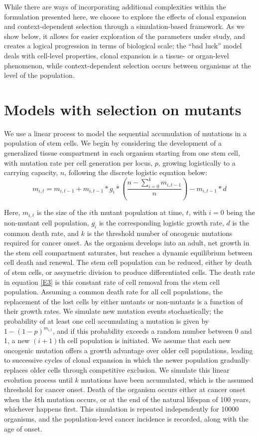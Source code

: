 \documentclass[9pt,twocolumn,twoside]{pnas-new}
\begin{document}
While there are ways of incorporating additional complexities within the formulation presented here, we choose to explore the effects of clonal expansion and context-dependent selection through a simulation-based framework. As we show below, it allows for easier exploration of the parameters under study, and creates a logical progression in terms of biological scale; the ``bad luck'' model deals with cell-level properties, clonal expansion is a tissue- or organ-level phenomenon, while context-dependent selection occurs between organisms at the level of the population.

\section*{Models with selection on mutants}
We use a linear process to model the sequential accumulation of mutations in a population of stem cells. We begin by considering the development of a generalized tissue compartment in each organism starting from one stem cell, with mutation rate per cell generation per locus, $p$, growing logistically to a carrying capacity, $n$, following the discrete logistic equation below:
\begin{equation}
	m_{i, t} = m_{i, t-1} + m_{i, t-1}*g_{i}*(\dfrac{n-\sum_{i=0}^{k} m_{i, t-1}}{n}) - m_{i, t-1}*d
	\label{E3}	
\end{equation}

Here, $m_{i, t}$ is the size of the $i$th mutant population at time, $t$, with $i=0$ being the non-mutant cell population, $g_{i}$ is the corresponding logistic growth rate, $d$ is the common death rate, and $k$ is the threshold number of oncogenic mutations required for cancer onset. As the organism develops into an adult, net growth in the stem cell compartment saturates, but reaches a dynamic equilibrium between cell death and renewal. The stem cell population can be reduced, either by death of stem cells, or assymetric division to produce differentiated cells. The death rate in equation \ref{E3} is this constant rate of cell removal from the stem cell population. Assuming a common death rate for all cell populations, the replacement of the lost cells by either mutants or non-mutants is a function of their growth rates. We simulate new mutation events stochastically; the probability of at least one cell accumulating a mutation is given by $1-(1-p)^{m_{i, t}}$, and if this probability exceeds a random number between 0 and 1, a new $(i+1)$th cell population is initiated. We assume that each new oncogenic mutation offers a growth advantage over older cell populations, leading to successive cycles of clonal expansion in which the newer population gradually replaces older cells through competitive exclusion. We simulate this linear evolution process until $k$ mutations have been accumulated, which is the assumed threshold for cancer onset. Death of the organism occurs either at cancer onset when the $k$th mutation occurs, or at the end of the natural lifespan of 100 years, whichever happens first. This simulation is repeated independently for 10000 organisms, and the population-level cancer incidence is recorded, along with the age of onset.
\end{document}
